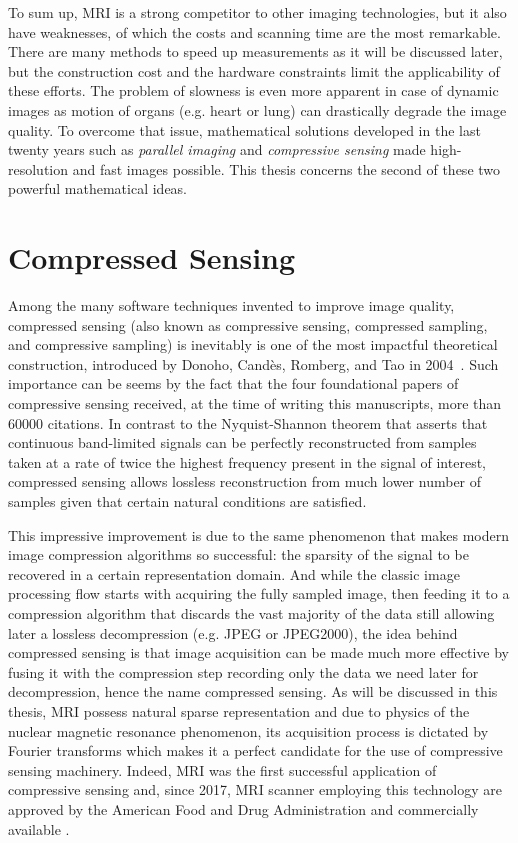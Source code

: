 To sum up, MRI is a strong competitor to other imaging technologies, but it also have weaknesses, of which the costs and scanning time are the most remarkable. There are many methods to speed up measurements as it will be discussed later, but the construction cost and the hardware constraints limit the applicability of these efforts. The problem of slowness is even more apparent in case of dynamic images as motion of organs (e.g. heart or lung) can drastically degrade the image quality. To overcome that issue, mathematical solutions developed in the last twenty years such as \emph{parallel imaging} and \emph{compressive sensing} made high-resolution and fast images possible. This thesis concerns the second of these two powerful mathematical ideas.

\section{Compressed Sensing}

Among the many software techniques invented to improve image quality, compressed sensing (also known as compressive sensing, compressed sampling, and compressive sampling) is inevitably is one of the most impactful theoretical construction, introduced by Donoho, Candès, Romberg, and Tao in 2004~\cite{candes_robust_2006, donoho_compressed_2006, candes_nearoptimal_2006}. Such importance can be seems by the fact that the four foundational papers of compressive sensing received, at the time of writing this manuscripts, more than 60000 citations. In contrast to the Nyquist-Shannon theorem that asserts that continuous band-limited signals can be perfectly reconstructed from samples taken at a rate of twice the highest frequency present in the signal of interest, compressed sensing allows lossless reconstruction from much lower number of samples given that certain natural conditions are satisfied.

This impressive improvement is due to the same phenomenon that makes modern image compression algorithms so successful: the sparsity of the signal to be recovered in a certain representation domain. And while the classic image processing flow starts with acquiring the fully sampled image, then feeding it to a compression algorithm that discards the vast majority of the data still allowing later a lossless decompression (e.g. JPEG or JPEG2000), the idea behind compressed sensing is that image acquisition can be made much more effective by fusing it with the compression step recording only the data we need later for decompression, hence the name compressed sensing. As will be discussed in this thesis, MRI possess natural sparse representation and due to physics of the nuclear magnetic resonance phenomenon, its acquisition process is dictated by Fourier transforms which makes it a perfect candidate for the use of compressive sensing machinery. Indeed, MRI was the first successful application of compressive sensing \cite{lustig} and, since 2017, MRI scanner employing this technology are approved by the American Food and Drug Administration and commercially available \cite{fda_siemens, fda_GE}.

